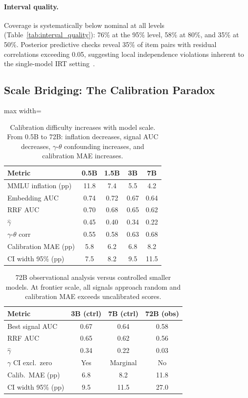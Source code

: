 \documentclass[letterpaper,11pt]{article}
\begin{document}
\paragraph{Interval quality.}
Coverage is systematically below nominal at all levels (Table~\ref{tab:interval_quality}): 76\% at the 95\% level, 58\% at 80\%, and 35\% at 50\%.
Posterior predictive checks reveal 35\% of item pairs with residual correlations exceeding 0.05, suggesting local independence violations inherent to the single-model IRT setting~\citep{mislevy1986recent}.

\subsection{Scale Bridging: The Calibration Paradox}
\label{sec:scaling}

\begin{table}[t]
\centering
\caption{Calibration difficulty increases with model scale. From 0.5B to 72B: inflation decreases, signal AUC decreases, $\gamma$-$\theta$ confounding increases, and calibration MAE increases.}
\label{tab:scale_bridging}
\begin{adjustbox}{max width=\columnwidth}
\begin{tabular}{@{}lcccc@{}}
\toprule
Metric & 0.5B & 1.5B & 3B & 7B \\
\midrule
MMLU inflation (pp) & 11.8 & 7.4 & 5.5 & 4.2 \\
Embedding AUC & 0.74 & 0.72 & 0.67 & 0.64 \\
RRF AUC & 0.70 & 0.68 & 0.65 & 0.62 \\
$\hat{\gamma}$ & 0.45 & 0.40 & 0.34 & 0.22 \\
$\gamma$-$\theta$ corr & 0.55 & 0.58 & 0.63 & 0.68 \\
Calibration MAE (pp) & 5.8 & 6.2 & 6.8 & 8.2 \\
CI width 95\% (pp) & 7.5 & 8.2 & 9.5 & 11.5 \\
\bottomrule
\end{tabular}
\end{adjustbox}
\end{table}

\begin{table}[t]
\centering
\caption{72B observational analysis versus controlled smaller models. At frontier scale, all signals approach random and calibration MAE exceeds uncalibrated scores.}
\label{tab:72b}
\begin{tabular}{@{}lccc@{}}
\toprule
Metric & 3B (ctrl) & 7B (ctrl) & 72B (obs) \\
\midrule
Best signal AUC & 0.67 & 0.64 & 0.58 \\
RRF AUC & 0.65 & 0.62 & 0.56 \\
$\hat{\gamma}$ & 0.34 & 0.22 & 0.03 \\
$\gamma$ CI excl.\ zero & Yes & Marginal & No \\
Calib.\ MAE (pp) & 6.8 & 8.2 & 11.8 \\
CI width 95\% (pp) & 9.5 & 11.5 & 27.0 \\
\bottomrule
\end{tabular}
\end{table}
\end{document}
